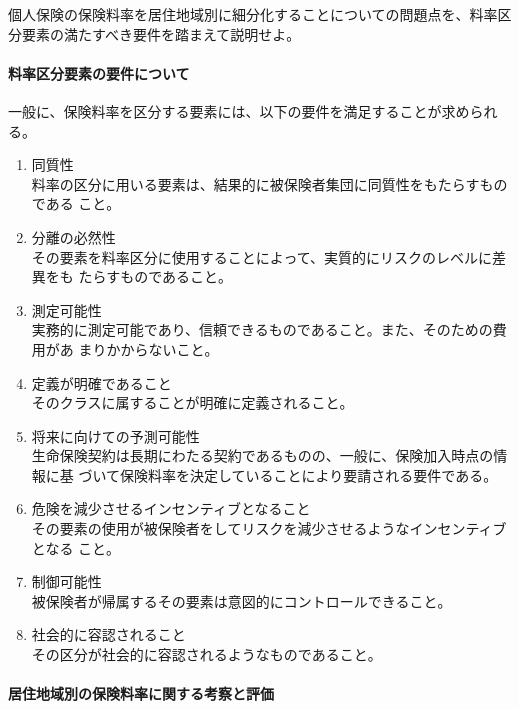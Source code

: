 \documentclass[report,gutter=10mm,fore-edge=10mm,uplatex,dvipdfmx]{jlreq}
\begin{document}

個人保険の保険料率を居住地域別に細分化することについての問題点を、料率区分要素の満たすべき要件を踏まえて説明せよ。


\paragraph{料率区分要素の要件について}
一般に、保険料率を区分する要素には、以下の要件を満足することが求められる。
\begin{enumerate}[1.]
\tightlist
\item
  同質性\\
料率の区分に用いる要素は、結果的に被保険者集団に同質性をもたらすものである
こと。
\item
  分離の必然性\\
その要素を料率区分に使用することによって、実質的にリスクのレベルに差異をも
たらすものであること。
\item
  測定可能性\\
実務的に測定可能であり、信頼できるものであること。また、そのための費用があ
まりかからないこと。
\item
  定義が明確であること\\
そのクラスに属することが明確に定義されること。
\item
  将来に向けての予測可能性\\
生命保険契約は長期にわたる契約であるものの、一般に、保険加入時点の情報に基
づいて保険料率を決定していることにより要請される要件である。
\item
  危険を減少させるインセンティブとなること\\
その要素の使用が被保険者をしてリスクを減少させるようなインセンティブとなる
こと。
\item
  制御可能性\\
被保険者が帰属するその要素は意図的にコントロールできること。
\item
  社会的に容認されること\\
その区分が社会的に容認されるようなものであること。
\end{enumerate}

\paragraph{居住地域別の保険料率に関する考察と評価}
\end{document}
